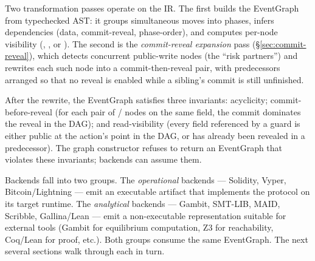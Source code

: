 Two transformation passes operate on the IR.  The first builds the
EventGraph from typechecked AST: it groups simultaneous moves into
phases, infers dependencies (data, commit-reveal, phase-order), and
computes per-node visibility (\COMMIT, \REVEAL, or \PUBLIC).  The
second is the \emph{commit-reveal expansion} pass
(\S\ref{sec:commit-reveal}), which detects concurrent
public-write nodes (the ``risk partners'') and rewrites each such
node into a commit-then-reveal pair, with predecessors arranged so
that no reveal is enabled while a sibling's commit is still
unfinished.

After the rewrite, the EventGraph satisfies three invariants:
acyclicity; commit-before-reveal (for each pair of \COMMIT/\REVEAL
nodes on the same field, the commit dominates the reveal in the
DAG); and read-visibility (every field referenced by a guard is
either public at the action's point in the DAG, or has already been
revealed in a predecessor).  The graph constructor refuses to
return an EventGraph that violates these invariants; backends can
assume them.

Backends fall into two groups.  The \emph{operational} backends ---
Solidity, Vyper, Bitcoin/Lightning --- emit an executable artifact
that implements the protocol on its target runtime.  The
\emph{analytical} backends --- Gambit, SMT-LIB, MAID, Scribble,
Gallina/Lean --- emit a non-executable representation suitable for
external tools (Gambit for equilibrium computation, Z3 for
reachability, Coq/Lean for proof, etc.).  Both groups consume the
same EventGraph.  The next several sections walk through each
in turn.
